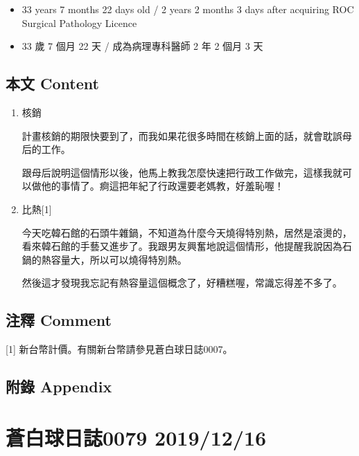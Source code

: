 \documentclass[a5paper, 12pt
]{book}
\providecommand{\tightlist}{%
  \setlength{\itemsep}{0pt}\setlength{\parskip}{0pt}}
\begin{document}
\begin{itemize}
\tightlist
\item
  33 years 7 months 22 days old / 2 years 2 months 3 days after
  acquiring ROC Surgical Pathology Licence
\item
  33 歲 7 個月 22 天 / 成為病理專科醫師 2 年 2 個月 3 天
\end{itemize}

\hypertarget{ux672cux6587-content-14}{%
\subsection{本文 Content}\label{ux672cux6587-content-14}}

\begin{enumerate}
\def\labelenumi{\arabic{enumi}.}
\item
  核銷

  計畫核銷的期限快要到了，而我如果花很多時間在核銷上面的話，就會耽誤母后的工作。

  跟母后說明這個情形以後，他馬上教我怎麼快速把行政工作做完，這樣我就可以做他的事情了。痾這把年紀了行政還要老媽教，好羞恥喔！
\item
  比熱{[}1{]}

  今天吃韓石館的石頭牛雜鍋，不知道為什麼今天燒得特別熱，居然是滾燙的，看來韓石館的手藝又進步了。我跟男友興奮地說這個情形，他提醒我說因為石鍋的熱容量大，所以可以燒得特別熱。

  然後這才發現我忘記有熱容量這個概念了，好糟糕喔，常識忘得差不多了。
\end{enumerate}

\hypertarget{ux6ce8ux91cb-comment-13}{%
\subsection{注釋 Comment}\label{ux6ce8ux91cb-comment-13}}

{[}1{]} 新台幣計價。有關新台幣請參見蒼白球日誌0007。

\hypertarget{ux9644ux9304-appendix-14}{%
\subsection{附錄 Appendix}\label{ux9644ux9304-appendix-14}}

\hypertarget{ux84bcux767dux7403ux65e5ux8a8c0079-20191216}{%
\section{蒼白球日誌0079
2019/12/16}\label{ux84bcux767dux7403ux65e5ux8a8c0079-20191216}}
\end{document}

